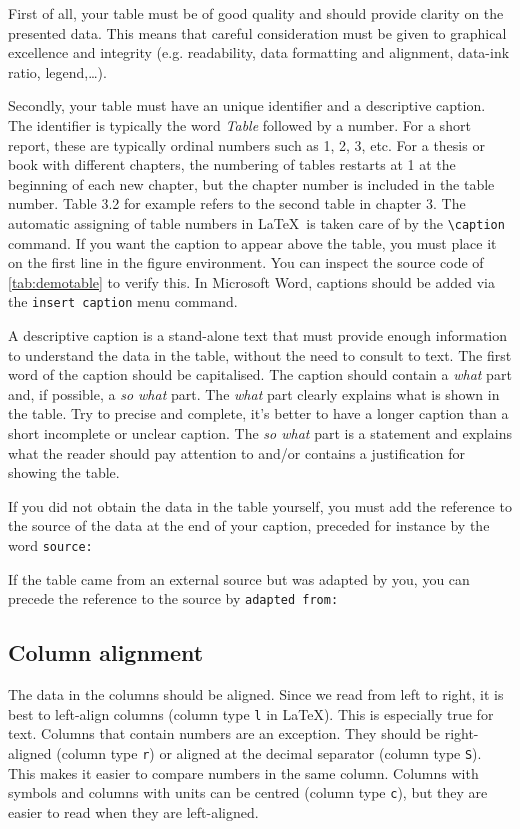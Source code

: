 First of all, your table must be of good quality and should provide clarity on the presented data. This means that careful consideration must be given to graphical excellence and integrity (e.g. readability, data formatting and alignment, data-ink ratio, legend,\dots).

Secondly, your table must have an unique identifier and a descriptive caption. The identifier is typically the word \textit{Table} followed by a number. For a short report, these are typically ordinal numbers such as 1, 2, 3, etc. For a thesis or book with different chapters, the numbering of tables restarts at 1 at the beginning of each new chapter, but the chapter number is included in the table number. Table 3.2 for example refers to the second table in chapter 3. The automatic assigning of table numbers in \LaTeX\ is taken care of by the \verb|\caption| command. If you want the caption to appear above the table, you must place it on the first line in the figure environment. You can inspect the source code of \cref{tab:demotable} to verify this. In Microsoft Word, captions should be added via the \texttt{insert caption} menu command.

A descriptive caption is a stand-alone text that must provide enough information to understand the data in the table, without the need to consult to text. The first word of the caption should be capitalised. The caption should contain a \textit{what} part and, if possible, a \textit{so what} part. The \textit{what} part clearly explains what is shown in the table. Try to precise and complete, it's better to have a longer caption than a short incomplete or unclear caption. The \textit{so what} part is a statement and explains what the reader should pay attention to and/or contains a justification for showing the table.

If you did not obtain the data in the table yourself, you must add the reference to the source of the data at the end of your caption, preceded for instance by the word \verb|source:|

If the table came from an external source but was adapted by you, you can precede the reference to the source by \verb|adapted from:|

\subsection{Column alignment}
The data in the columns should be aligned. Since we read from left to right, it is best to left-align columns (column type \texttt{l} in \LaTeX). This is especially true for text. Columns that contain numbers are an exception. They should be right-aligned (column type \texttt{r}) or aligned at the decimal separator (column type \texttt{S}). This makes it easier to compare numbers in the same column. Columns with symbols and columns with units can be centred (column type \texttt{c}), but they are easier to read when they are left-aligned.

